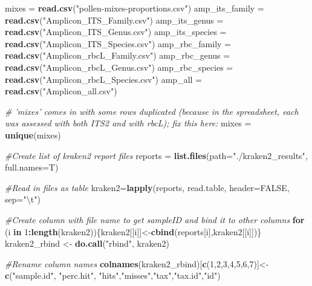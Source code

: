 \documentclass[
]{article}
\newenvironment{Shaded}{\begin{snugshade}}{\end{snugshade}}
\newcommand{\CharTok}[1]{\textcolor[rgb]{0.31,0.60,0.02}{#1}}
\newcommand{\CommentTok}[1]{\textcolor[rgb]{0.56,0.35,0.01}{\textit{#1}}}
\newcommand{\ControlFlowTok}[1]{\textcolor[rgb]{0.13,0.29,0.53}{\textbf{#1}}}
\newcommand{\DataTypeTok}[1]{\textcolor[rgb]{0.13,0.29,0.53}{#1}}
\newcommand{\DecValTok}[1]{\textcolor[rgb]{0.00,0.00,0.81}{#1}}
\newcommand{\KeywordTok}[1]{\textcolor[rgb]{0.13,0.29,0.53}{\textbf{#1}}}
\newcommand{\NormalTok}[1]{#1}
\newcommand{\OperatorTok}[1]{\textcolor[rgb]{0.81,0.36,0.00}{\textbf{#1}}}
\newcommand{\OtherTok}[1]{\textcolor[rgb]{0.56,0.35,0.01}{#1}}
\newcommand{\StringTok}[1]{\textcolor[rgb]{0.31,0.60,0.02}{#1}}
\begin{document}
\begin{Shaded}
\begin{Highlighting}[]
\NormalTok{mixes =}\StringTok{ }\KeywordTok{read.csv}\NormalTok{(}\StringTok{"pollen-mixes-proportions.csv"}\NormalTok{)}
\NormalTok{amp_its_family =}\StringTok{ }\KeywordTok{read.csv}\NormalTok{(}\StringTok{"Amplicon_ITS_Family.csv"}\NormalTok{)}
\NormalTok{amp_its_genus =}\StringTok{ }\KeywordTok{read.csv}\NormalTok{(}\StringTok{"Amplicon_ITS_Genus.csv"}\NormalTok{)}
\NormalTok{amp_its_species =}\StringTok{ }\KeywordTok{read.csv}\NormalTok{(}\StringTok{"Amplicon_ITS_Species.csv"}\NormalTok{)}
\NormalTok{amp_rbc_family =}\StringTok{ }\KeywordTok{read.csv}\NormalTok{(}\StringTok{"Amplicon_rbcL_Family.csv"}\NormalTok{)}
\NormalTok{amp_rbc_genus =}\StringTok{ }\KeywordTok{read.csv}\NormalTok{(}\StringTok{"Amplicon_rbcL_Genus.csv"}\NormalTok{)}
\NormalTok{amp_rbc_species =}\StringTok{ }\KeywordTok{read.csv}\NormalTok{(}\StringTok{"Amplicon_rbcL_Species.csv"}\NormalTok{)}
\NormalTok{amp_all =}\StringTok{ }\KeywordTok{read.csv}\NormalTok{(}\StringTok{"Amplicon_all.csv"}\NormalTok{)}

\CommentTok{# 'mixes' comes in with some rows duplicated (because in the spreadsheet, each was assessed with both ITS2 and with rbcL); fix this here:}
\NormalTok{mixes =}\StringTok{ }\KeywordTok{unique}\NormalTok{(mixes)}

\CommentTok{#Create list of kraken2 report files}
\NormalTok{reports =}\StringTok{ }\KeywordTok{list.files}\NormalTok{(}\DataTypeTok{path=}\StringTok{"./kraken2_results"}\NormalTok{, }\DataTypeTok{full.names=}\NormalTok{T)}

\CommentTok{#Read in files as table}
\NormalTok{kraken2=}\KeywordTok{lapply}\NormalTok{(reports, read.table, }\DataTypeTok{header=}\OtherTok{FALSE}\NormalTok{, }\DataTypeTok{sep=}\StringTok{"}\CharTok{\textbackslash{}t}\StringTok{"}\NormalTok{)}

\CommentTok{#Create column with file name to get sampleID and bind it to other columns}
\ControlFlowTok{for}\NormalTok{ (i }\ControlFlowTok{in} \DecValTok{1}\OperatorTok{:}\KeywordTok{length}\NormalTok{(kraken2))\{kraken2[[i]]<-}\KeywordTok{cbind}\NormalTok{(reports[i],kraken2[[i]])\}}
\NormalTok{kraken2_rbind <-}\StringTok{ }\KeywordTok{do.call}\NormalTok{(}\StringTok{"rbind"}\NormalTok{, kraken2) }

\CommentTok{#Rename column names}
\KeywordTok{colnames}\NormalTok{(kraken2_rbind)[}\KeywordTok{c}\NormalTok{(}\DecValTok{1}\NormalTok{,}\DecValTok{2}\NormalTok{,}\DecValTok{3}\NormalTok{,}\DecValTok{4}\NormalTok{,}\DecValTok{5}\NormalTok{,}\DecValTok{6}\NormalTok{,}\DecValTok{7}\NormalTok{)]<-}\KeywordTok{c}\NormalTok{(}\StringTok{"sample.id"}\NormalTok{, }\StringTok{"perc.hit"}\NormalTok{, }\StringTok{"hits"}\NormalTok{,}\StringTok{"misses"}\NormalTok{,}\StringTok{"tax"}\NormalTok{,}\StringTok{"tax.id"}\NormalTok{,}\StringTok{"id"}\NormalTok{)}
\end{Highlighting}
\end{Shaded}
\end{document}
